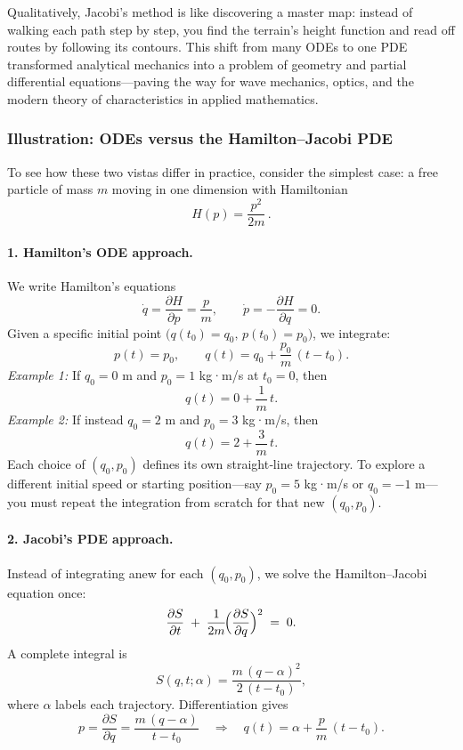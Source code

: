 Qualitatively, Jacobi’s method is like discovering a master map:  
instead of walking each path step by step, you find the terrain’s height function and read off routes by following its contours.  
This shift from many ODEs to one PDE transformed analytical mechanics into a problem of geometry and partial differential equations—paving the way for wave mechanics, optics, and the modern theory of characteristics in applied mathematics.


\subsubsection*{Illustration: ODEs versus the Hamilton–Jacobi PDE}

To see how these two vistas differ in practice, consider the simplest case: a free particle of mass \(m\) moving in one dimension with Hamiltonian
\[
H(p) = \frac{p^2}{2m}\,.
\]

\paragraph{1. Hamilton’s ODE approach.}  
We write Hamilton’s equations
\[
\dot q = \frac{\partial H}{\partial p} = \frac{p}{m},
\qquad
\dot p = -\frac{\partial H}{\partial q} = 0.
\]
Given a specific initial point \(\bigl(q(t_{0})=q_{0},\,p(t_{0})=p_{0}\bigr)\), we integrate:
\[
p(t) = p_{0},
\qquad
q(t) = q_{0} + \frac{p_{0}}{m}\,(t - t_{0}).
\]
\emph{Example 1:} If \(q_{0}=0\) m and \(p_{0}=1\) kg·m/s at \(t_{0}=0\), then
\[
q(t) = 0 + \frac{1}{m}\,t.
\]
\emph{Example 2:} If instead \(q_{0}=2\) m and \(p_{0}=3\) kg·m/s, then
\[
q(t) = 2 + \frac{3}{m}\,t.
\]
Each choice of \((q_{0},p_{0})\) defines its own straight‐line trajectory.  To explore a different initial speed or starting position—say \(p_{0}=5\) kg·m/s or \(q_{0}=-1\) m—you must repeat the integration from scratch for that new \((q_{0},p_{0})\).  


\paragraph{2. Jacobi’s PDE approach.}  
Instead of integrating anew for each \((q_{0},p_{0})\), we solve the Hamilton–Jacobi equation once:
\[
\frac{\partial S}{\partial t}
\;+\;
\frac{1}{2m}\!\Bigl(\frac{\partial S}{\partial q}\Bigr)^{2}
\;=\;0.
\]
A complete integral is
\[
S(q,t;\alpha)
=
\frac{m\,(q - \alpha)^{2}}{2\,(t - t_{0})},
\]
where \(\alpha\) labels each trajectory.  Differentiation gives
\[
p = \frac{\partial S}{\partial q}
= \frac{m\,(q - \alpha)}{t - t_{0}}
\quad\Longrightarrow\quad
q(t) = \alpha + \frac{p}{m}\,(t - t_{0}).
\]

